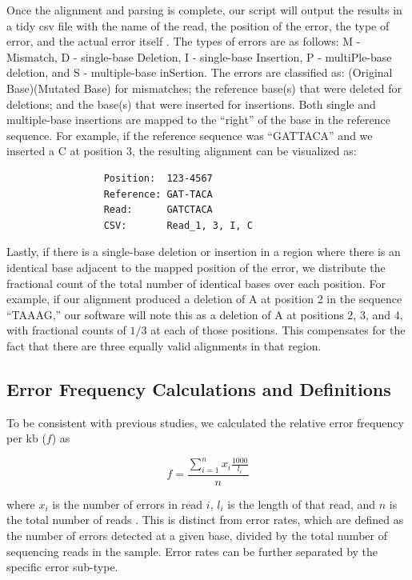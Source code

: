 \documentclass[twocolumn]{article}
\begin{document}
Once the alignment and parsing is complete, our script will output the results in a tidy csv file with the name of the read, the position of the error, the type of error, and the actual error itself \cite{wickham2014}. The types of errors are as follows: M - Mismatch, D - single-base Deletion, I - single-base Insertion, P - multiPle-base deletion, and S - multiple-base inSertion. The errors are classified as: (Original Base)(Mutated Base) for mismatches; the reference base(s) that were deleted for deletions; and the base(s) that were inserted for insertions. Both single and multiple-base insertions are mapped to the ``right'' of the base in the reference sequence. For example, if the reference sequence was ``GATTACA'' and we inserted a C at position 3, the resulting alignment can be visualized as:

\begin{verbatim}
                 Position:  123-4567
                 Reference: GAT-TACA
                 Read:      GATCTACA
                 CSV:       Read_1, 3, I, C
\end{verbatim}

Lastly, if there is a single-base deletion or insertion in a region where there is an identical base adjacent to the mapped position of the error, we distribute the fractional count of the total number of identical bases over each position. For example, if our alignment produced a deletion of A at position 2 in the sequence ``TAAAG,'' our software will note this as a deletion of A at positions 2, 3, and 4, with fractional counts of $1/3$ at each of those positions. This compensates for the fact that there are three equally valid alignments in that region.

\subsection*{Error Frequency Calculations and Definitions}
To be consistent with previous studies, we calculated the relative error frequency per kb ($f$) as

\begin{equation}
f = \frac{\displaystyle \sum^{n}_{i=1} x_i \frac{1000}{l_i}}{n}
\end{equation}

\noindent where $x_i$ is the number of errors in read $i$, $l_i$ is the length of that read, and $n$ is the total number of reads \cite{fuhrmann2005}. This is distinct from error rates, which are defined as the number of errors detected at a given base, divided by the total number of sequencing reads in the sample. Error rates can be further separated by the specific error sub-type.
\end{document}
